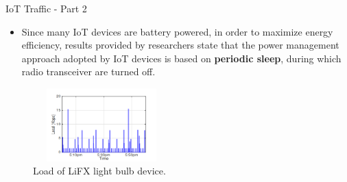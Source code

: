 \documentclass[10pt]{beamer}
\begin{document}
\begin{frame}{IoT Traffic - Part 2}

\begin{itemize}
\justifying
\item Since many IoT devices are battery powered, in order to maximize energy efficiency, results provided by researchers state that the power management approach adopted by IoT devices is based on \textbf{periodic sleep}, during which radio transceiver are turned off.
\end{itemize}

\begin{figure}
  \includegraphics[width=150pt, height=80pt]{SleepTime.png}
  \caption{Load of LiFX light bulb device.}
  \label{fig1}
\end{figure}

\end{frame} 
\end{document}
